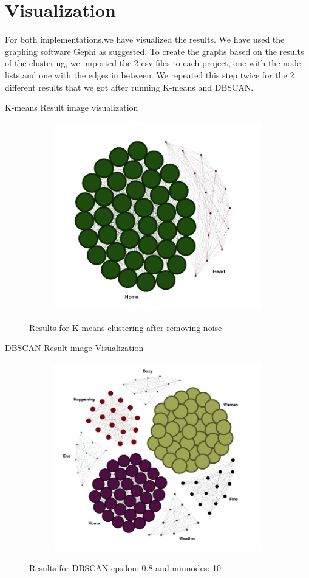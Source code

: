 \documentclass{article}
\begin{document}
\newpage
\section{Visualization}
        
For both implementations,we have visualized the results. We have used the graphing software Gephi as suggested.
To create the graphs based on the results of the clustering, we imported the 2 csv files to each project, one with the node lists and one with the edges in between. 
We repeated this step twice for the 2 different results that we got after running 
K-means and DBSCAN.


K-means Result image visualization

\begin{figure}[H]
    \begin{subfigure} {1\textwidth}  
        \centering 
        \includegraphics[width=0.6\linewidth]{./img/kmeans.jpeg}
    \end{subfigure}    
    \caption{Results for K-means clustering after removing noise}
    \label{fig:movement}
\end{figure}

DBSCAN Result image Visualization

\begin{figure}[H]
    \begin{subfigure} {1\textwidth}  
        \centering 
        \includegraphics[width=0.6\linewidth]{./img/dbscan.jpeg}
    \end{subfigure}    
    \caption{Results for DBSCAN epsilon: 0.8 and minnodes: 10}
    \label{fig:movement}
\end{figure}
\end{document}
